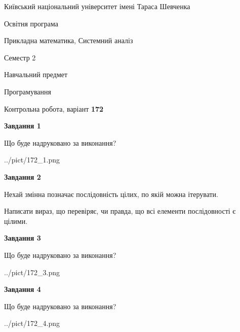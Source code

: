 \documentclass[12pt, ukrainian]{article}
\begin{document}
{{\begin {small}\par
{ \center  Київський національний університет імені Тараса Шевченка \par}
{\parbox {5 cm}{Освітня програма \hfill}{\parbox {8 cm}{Прикладна математика, Системний аналіз \hfill}}\parbox {5 cm}{\hfill Семестр 2}}\par
{\parbox {5 cm} {Навчальний предмет \hfill}\parbox {7 cm}{Програмування \hfill}\parbox {6cm}{\hfill}\par}\vspace{-7pt} \end{small}}{\center Контрольна робота, варіант  \No \textbf
{ 172 }\par}}
{
\begin {large}
{\begin {center}\textbf{Завдання 1}\end {center}}\par
Що буде надруковано за виконання?\par\par
\begin{center}
	{../pict/172_1.png}
\end{center}
\newpage

{\begin {center}\textbf{Завдання 2}\end {center}}\par
Нехай змінна  позначає послідовність цілих, по якій можна ітерувати.

Написати вираз, що перевіряє, чи правда, що всі елементи послідовності є цілими.\par
\newpage

{\begin {center}\textbf{Завдання 3}\end {center}}\par
Що буде надруковано за виконання?\par
\begin{center}
	{../pict/172_3.png}
\end{center}
\newpage

{\begin {center}\textbf{Завдання 4}\end {center}}\par
Що буде надруковано за виконання?\par
\begin{center}
	{../pict/172_4.png}
\end{center}
\newpage


\end{large}}
\end{document}
